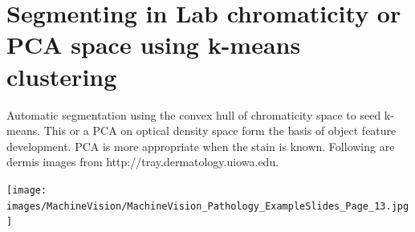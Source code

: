 \section{Segmenting in Lab chromaticity or PCA space using k-means clustering}
Automatic segmentation using the convex hull of chromaticity space to seed k-means. This or a PCA on optical density space form the basis of object feature development. PCA is more appropriate when the stain is known. Following are dermis images from http://tray.dermatology.uiowa.edu.

\texttt{[image: images/MachineVision/MachineVision\_Pathology\_ExampleSlides\_Page\_13.jpg]}


%
%
%

%


